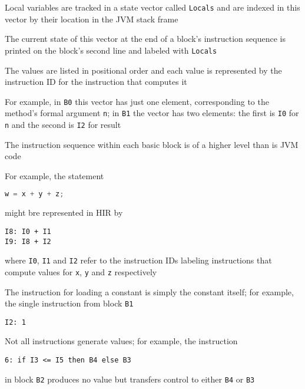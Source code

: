 \documentclass[8pt,a4paper,compress]{beamer}
\begin{document}
\begin{frame}[fragile]
\pause

Local variables are tracked in a state vector called \lstinline{Locals} and are indexed in this vector
by their location in the JVM stack frame

\pause
\bigskip

The current state of this vector at the end of a block's instruction sequence is printed on the block's second line and labeled with \lstinline{Locals}

\pause
\bigskip

The values are listed in positional order and each value is represented by the instruction ID for the instruction that computes it

\pause
\bigskip

For example, in \lstinline{B0} this vector has just one element, corresponding to the method's formal argument \lstinline{n}; in \lstinline{B1} the vector has two elements: the first is \lstinline{I0} for \lstinline{n} and the second is \lstinline{I2} for result

\pause
\bigskip

The instruction sequence within each basic block is of a higher level than is JVM code

\pause
\bigskip

For example, the \jmm statement 
\begin{lstlisting}[language=Java]
w = x + y + z;
\end{lstlisting}
\noindent might bre represented in HIR by
\begin{lstlisting}[language={}]
I8: I0 + I1
I9: I8 + I2
\end{lstlisting}
where \lstinline{I0}, \lstinline{I1} and \lstinline{I2} refer to the instruction IDs labeling instructions that compute values for \lstinline{x}, \lstinline{y} and \lstinline{z} respectively
\end{frame}

\begin{frame}[fragile]
\pause

The instruction for loading a constant is simply the constant itself; for example, the single instruction from block \lstinline{B1} 
\begin{lstlisting}[language={}]
I2: 1
\end{lstlisting}

\pause
\bigskip

Not all instructions generate values; for example, the instruction
\begin{lstlisting}[language={}]
6: if I3 <= I5 then B4 else B3
\end{lstlisting}
\noindent in block \lstinline{B2} produces no value but transfers control to either \lstinline{B4} or \lstinline{B3}
\end{frame}
\end{document}
